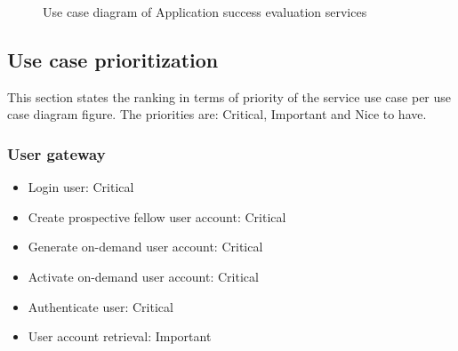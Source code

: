 \documentclass[12pt]{article}
\begin{document}
\begin{figure}[H]
\centering	
{}
\caption{Use case diagram of Application success evaluation services}
\end{figure}



\newpage
\subsection{Use case prioritization}
\vspace{0.2in}
This section states the ranking in terms of priority of the service use case per use case diagram figure. The priorities are: Critical, Important and Nice to have.\\ 

\subsubsection{User gateway}
\begin{itemize}
	\item Login user: Critical	
	\item Create prospective fellow user account: Critical
	\item Generate on-demand user account: Critical
	\item Activate on-demand user account: Critical
	\item Authenticate user: Critical
	\item User account retrieval: Important
\end{itemize}
\end{document}
